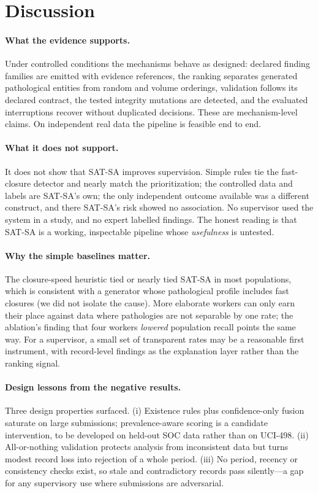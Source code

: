 \section{Discussion}
\label{sec:discussion}

\paragraph{What the evidence supports.}
Under controlled conditions the mechanisms behave as designed: declared finding
families are emitted with evidence references, the ranking separates generated
pathological entities from random and volume orderings, validation follows its
declared contract, the tested integrity mutations are detected, and the evaluated
interruptions recover without duplicated decisions. These are mechanism-level
claims. On independent real data the pipeline is feasible end to end.

\paragraph{What it does not support.}
It does not show that SAT-SA improves supervision. Simple rules tie the fast-closure
detector and nearly match the prioritization; the controlled data and labels are
SAT-SA's own; the only independent outcome available was a different construct,
and there SAT-SA's risk showed no association. No supervisor used the system in a
study, and no expert labelled findings. The honest reading is that SAT-SA is a
working, inspectable pipeline whose \emph{usefulness} is untested.

\paragraph{Why the simple baselines matter.}
The closure-speed heuristic tied or nearly tied SAT-SA in most populations,
which is consistent with a generator whose pathological profile includes fast
closures (we did not isolate the cause). More elaborate
workers can only earn their place against data where pathologies are not
separable by one rate; the ablation's finding that four workers \emph{lowered}
population recall points the same way. For a supervisor, a small set of transparent
rates may be a reasonable first instrument, with record-level findings as the
explanation layer rather than the ranking signal.

\paragraph{Design lessons from the negative results.}
Three design properties surfaced. (i) Existence rules plus confidence-only fusion
saturate on large submissions; prevalence-aware scoring is a candidate
intervention, to be developed on held-out SOC data rather than on UCI-498.
(ii) All-or-nothing validation protects analysis from inconsistent data but turns
modest record loss into rejection of a whole period. (iii) No period, recency or
consistency checks exist, so stale and contradictory records pass silently---a gap
for any supervisory use where submissions are adversarial.

